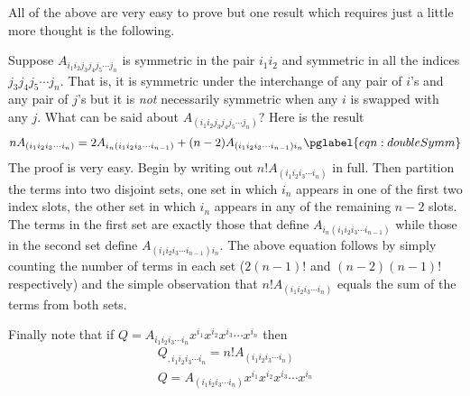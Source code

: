 \documentclass[a4paper,12pt]{article}
\numberwithin{equation}{section}
\begin{document}
All of the above are very easy to prove but one result which requires just a little more
thought is the following.

Suppose $A_{i_1i_2j_3j_4j_5\cdots j_n}$ is symmetric in the pair $i_1i_2$ and symmetric in
all the indices $j_3j_4j_5\cdots j_n$. That is, it is symmetric under the interchange of any
pair of $i$'s and any pair of $j$'s but it is \emph{not} necessarily symmetric when any $i$
is swapped with any $j$. What can be said about $A_{(i_1i_2j_3j_4j_5\cdots j_n)}$? Here is
the result
\begin{gather}
n A_{(i_1i_2i_3\cdots i_n)}
= 2 A_{i_n(i_1i_2i_3\cdots i_{n-1})}
+ (n-2) A_{(i_1i_2i_3\cdots i_{n-1})i_n}
\pglabel{eqn:doubleSymm}
\end{gather}
The proof is very easy. Begin by writing out $n!A_{(i_1i_2i_3\cdots i_n)}$ in full. Then
partition the terms into two disjoint sets, one set in which $i_n$ appears in one of the
first two index slots, the other set in which $i_n$ appears in any of the remaining $n-2$
slots. The terms in the first set are exactly those that define $A_{i_n(i_1i_2i_3\cdots
i_{n-1})}$ while those in the second set define $A_{(i_1i_2i_3\cdots i_{n-1})i_n}$. The
above equation follows by simply counting the number of terms in each set ($2(n-1)!$ and
$(n-2)(n-1)!$ respectively) and the simple observation that $n!A_{(i_1i_2i_3\cdots i_n)}$
equals the sum of the terms from both sets.

Finally note that if $Q=A_{i_1i_2i_3\cdots i_n}x^{i_1}x^{i_2}x^{i_3}\cdots x^{i_n}$
then
\begin{gather*}
Q_{,i_1i_2i_3\cdots i_n} = n! A_{(i_1i_2i_3\cdots i_n)}\\[10pt]
Q = A_{(i_1i_2i_3\cdots i_n)}x^{i_1}x^{i_2}x^{i_3}\cdots x^{i_n}
\end{gather*}

\printbibliography  %

% 
% 
\end{document}
